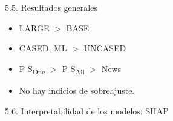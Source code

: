\begin{frame}{5.5. Resultados generales}
    \begin{itemize}
        \item LARGE $>$ BASE
        \item CASED, ML $>$ UNCASED
        \item {P-S}\textsubscript{One} $>$ {P-S}\textsubscript{All} $>$ News
        \item No hay indicios de sobreajuste.
    \end{itemize}
\end{frame}


\begin{frame}{5.6. Interpretabilidad de los modelos: SHAP}

\begin{figure}


\end{figure}
\end{frame}

